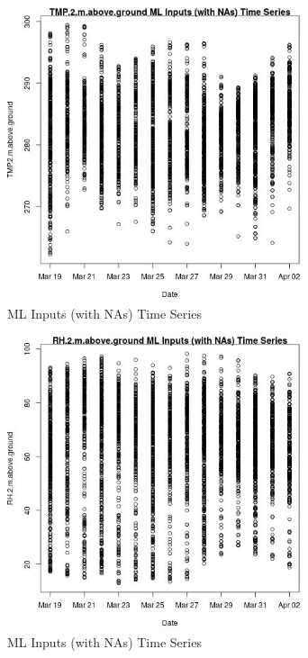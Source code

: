 \clearpage 

\begin{figure} 
\centering  
\includegraphics[width=0.77\textwidth]{Code_Outputs/Report_ML_input_PM25_Step4_part_e_de_duplicated_aveswNAs_TMP2mabovegroundvDate.jpg} 
\caption{\label{fig:Report_ML_input_PM25_Step4_part_e_de_duplicated_aveswNAsTMP2mabovegroundvDate}ML Inputs (with NAs) Time Series} 
\end{figure} 
 

\begin{figure} 
\centering  
\includegraphics[width=0.77\textwidth]{Code_Outputs/Report_ML_input_PM25_Step4_part_e_de_duplicated_aveswNAs_RH2mabovegroundvDate.jpg} 
\caption{\label{fig:Report_ML_input_PM25_Step4_part_e_de_duplicated_aveswNAsRH2mabovegroundvDate}ML Inputs (with NAs) Time Series} 
\end{figure} 
 

